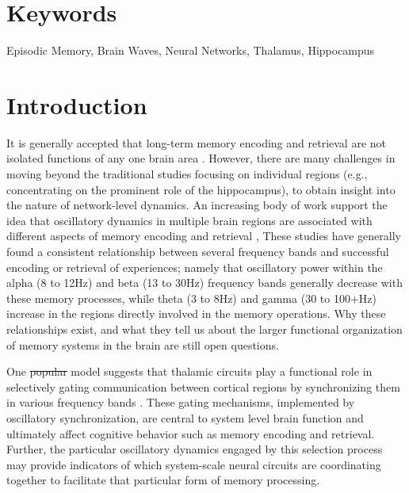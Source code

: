 \documentclass[11pt, titlepage, twoside]{article}
\providecommand{\DIFadd}[1]{{\protect\color{blue}\uwave{#1}}} %
\providecommand{\DIFdel}[1]{{\protect\color{red}\sout{#1}}}                      %
\providecommand{\DIFaddbegin}{} %
\providecommand{\DIFaddend}{} %
\providecommand{\DIFdelbegin}{} %
\providecommand{\DIFdelend}{} %
\begin{document}
\section*{Keywords}
Episodic Memory, Brain Waves, Neural Networks, Thalamus, Hippocampus


\section{Introduction}\label{sec:intro}

It is generally accepted that long-term memory encoding and retrieval are not isolated functions of any one brain area \cite{Gabrieli98,PrinceDaselaarCabeza05}.  However, there are many challenges in moving beyond the traditional studies focusing on individual regions  (e.g., concentrating on the prominent role of the hippocampus), to obtain insight into the nature of network-level dynamics.  An increasing body of work support the idea that oscillatory dynamics in multiple brain regions are associated with different aspects of  memory encoding and retrieval \cite{NyhusCurran10,HanslmayrStaudiglFellner12,Klimesch12}, %
These studies have generally found a consistent relationship between several frequency bands and successful encoding or retrieval of experiences; namely that oscillatory power within the alpha (8 to 12Hz) and beta (13 to 30Hz) frequency bands generally decrease with \DIFaddbegin \DIFadd{the successful execution of }\DIFaddend these memory processes, while theta (3 to 8Hz) and gamma (30 to 100+Hz) increase in the regions directly involved in the memory operations. Why these relationships exist, and what they tell us about the larger functional organization of memory systems in the brain are still open questions.

One \DIFdelbegin \DIFdel{popular }\DIFdelend model suggests that thalamic circuits play a functional role in selectively gating communication between cortical regions by synchronizing them in various frequency bands \cite{ShermanGuillery06,SaalmannKastner11,KetzJensenOReilly15}.  These gating mechanisms, implemented  by oscillatory synchronization, are central to system level brain function and ultimately affect cognitive behavior such as memory encoding and retrieval.  Further, the particular oscillatory dynamics engaged by this selection process may provide indicators of which system-scale neural circuits are coordinating together to facilitate that particular form of memory processing.
\end{document}
